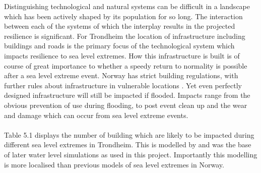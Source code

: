 Distinguishing technological and natural systems can be difficult in a landscape which has been actively shaped by its population for so long. The interaction between each of the systems of which the interplay results in the projected resilience is significant. For Trondheim the location of infrastructure including buildings and roads is the primary focus of the technological system which impacts resilience to sea level extremes. How this infrastructure is built is of course of great importance to whether a speedy return to normality is possible after a sea level extreme event. Norway has strict building regulations, with further rules about infrastructure in vulnerable locations \cite{direktoratet_for_byggkvalitet_direktoratet_nodate}. Yet even perfectly designed infrastructure will still be impacted if flooded. Impacts range from the obvious  prevention of use during flooding, to post event clean up and the wear and damage which can occur from sea level extreme events.
\paragraph{}
Table 5.1 displays the number of building which are likely to be impacted during different sea level extremes in Trondheim. This is modelled by \cite{kartverket_se_2021} and was the base of later water level simulations as used in this project. Importantly this modelling is more localised than previous models of sea level extremes in Norway.


